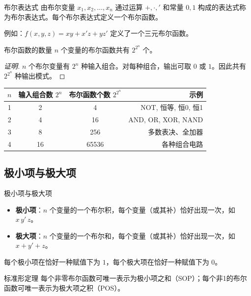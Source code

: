 \begin{mydefinition}{布尔表达式}
由布尔变量 \(x_1,x_2,\dots,x_n\) 通过运算 \(+,\cdot,{}'\) 和常量 \(0,1\) 构成的表达式称为布尔表达式。每个布尔表达式定义一个布尔函数。
\end{mydefinition}

例如：\(f(x,y,z)=xy+x'z+yz'\) 定义了一个三元布尔函数。

\begin{myTheorem}{布尔函数的数量}
\(n\) 个变量的布尔函数共有 \(2^{2^n}\) 个。
\end{myTheorem}

\begin{proof}[证明]
\(n\) 个布尔变量有 \(2^n\) 种输入组合。对每种组合，输出可取 \(0\) 或 \(1\)。因此共有 \(2^{2^n}\) 种输出模式。
\end{proof}

\begin{table}[H]
\centering
\begin{tabular}{cccr}
\toprule
\(n\) & 输入组合数 \(2^n\) & 布尔函数个数 \(2^{2^n}\) & 示例 \\
\midrule
1 & 2 & 4 & NOT, 恒等, 恒0, 恒1 \\
2 & 4 & 16 & AND, OR, XOR, NAND \\
3 & 8 & 256 & 多数表决、全加器 \\
4 & 16 & 65536 & 各种组合电路 \\
\bottomrule
\end{tabular}
\end{table}

\subsection{极小项与极大项}

\begin{mydefinition}{极小项与极大项}
\begin{itemize}
    \item \textbf{极小项}：\(n\) 个变量的一个布尔积，每个变量（或其补）恰好出现一次，如 \(x\,y'\,z\)。
    \item \textbf{极大项}：\(n\) 个变量的一个布尔和，每个变量（或其补）恰好出现一次，如 \(x+y'+z\)。
\end{itemize}
\end{mydefinition}

每个极小项在恰好一种赋值下为 \(1\)，每个极大项在恰好一种赋值下为 \(0\)。

\begin{myTheorem}{标准形定理}
每个非零布尔函数可唯一表示为极小项之和（SOP）；每个非1的布尔函数可唯一表示为极大项之积（POS）。
\end{myTheorem}

